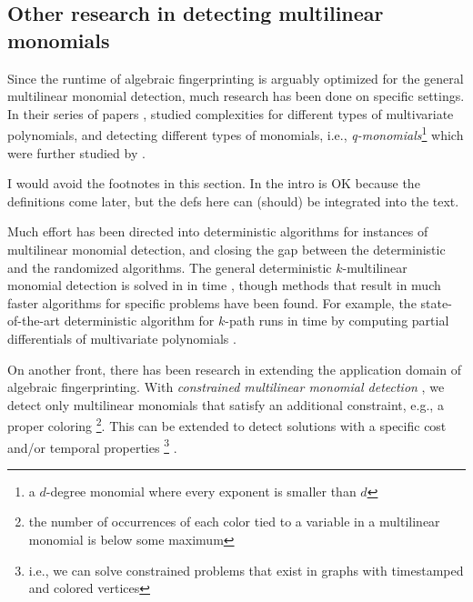 \subsection{Other research in detecting multilinear monomials}
\label{sect:other_improvements}

Since the runtime of algebraic fingerprinting is arguably optimized for 
the general multilinear monomial detection, much research has been 
done on specific settings. In their series of papers \cite{Chen11a, Chen11b, Chen10, Chen13a}, 
\citeauthor{Chen13a} studied complexities for different types of multivariate polynomials, and
detecting different types of monomials, i.e., 
\emph{q-monomials}\footnote{a $d$-degree monomial where every exponent is smaller than $d$} 
which were further studied by \textcite{Chen14}.

\begin{anamnote}[nomargin]{}
  I would avoid the footnotes in this section.
  In the intro is OK because the definitions come later, but the defs here can
  (should) be integrated into the text.
\end{anamnote}

Much effort \cite{Chen13b, Chen13c, Fomin14, Pratt19, Brand19, Brand21, Brand22}  
has been directed into deterministic algorithms for 
instances of multilinear monomial detection, and 
closing the gap between the deterministic and the randomized algorithms. 
The general deterministic $k$-multilinear monomial detection is solved in
in  time \cite{Fomin14}, though methods that result in 
much faster algorithms for specific problems 
have been found. For example, the state-of-the-art deterministic algorithm for $k$-path 
runs in  time by computing partial differentials of multivariate polynomials \cite{Brand21}.

%
On another front, there has been research in 
extending the application domain of algebraic fingerprinting. 
With \emph{constrained multilinear monomial detection} \cite{Koutis12, Björklund16}, 
we detect only multilinear monomials that satisfy an additional constraint, 
e.g., a proper coloring
\footnote{the number of occurrences of each color tied to a variable in a multilinear monomial is below some maximum}. 
This can be extended to detect solutions with a specific cost \cite{Björklund16} 
and/or temporal properties
\footnote{i.e., we can solve constrained problems that exist in graphs with timestamped and colored vertices} 
\cite{Thejaswi20}.

